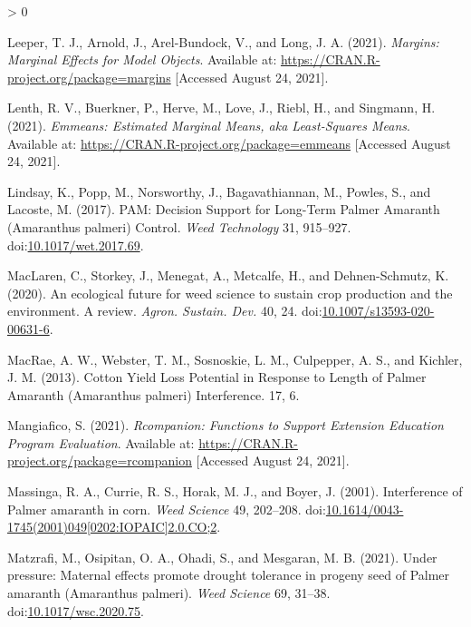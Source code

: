 \documentclass[utf8]{frontiersSCNS}
\newlength{\cslhangindent}
\newenvironment{CSLReferences}[2] %
 {%
  \setlength{\parindent}{0pt}
  \ifodd #1 \everypar{\setlength{\hangindent}{\cslhangindent}}\ignorespaces\fi
  \ifnum #2 > 0
  \setlength{\parskip}{#2\baselineskip}
  \fi
 }%
 {}
\begin{document}
\begin{CSLReferences}{1}{0}
\leavevmode\hypertarget{ref-leeper2021}{}%
Leeper, T. J., Arnold, J., Arel-Bundock, V., and Long, J. A. (2021).
\emph{Margins: {Marginal Effects} for {Model Objects}}. Available at:
\url{https://CRAN.R-project.org/package=margins} {[}Accessed August 24,
2021{]}.

\leavevmode\hypertarget{ref-lenth2021}{}%
Lenth, R. V., Buerkner, P., Herve, M., Love, J., Riebl, H., and
Singmann, H. (2021). \emph{Emmeans: {Estimated Marginal Means}, aka
{Least}-{Squares Means}}. Available at:
\url{https://CRAN.R-project.org/package=emmeans} {[}Accessed August 24,
2021{]}.

\leavevmode\hypertarget{ref-lindsay2017}{}%
Lindsay, K., Popp, M., Norsworthy, J., Bagavathiannan, M., Powles, S.,
and Lacoste, M. (2017). {PAM}: {Decision Support} for {Long}-{Term
Palmer Amaranth} ({Amaranthus} palmeri) {Control}. \emph{Weed
Technology} 31, 915--927.
doi:\href{https://doi.org/10.1017/wet.2017.69}{10.1017/wet.2017.69}.

\leavevmode\hypertarget{ref-maclaren2020}{}%
MacLaren, C., Storkey, J., Menegat, A., Metcalfe, H., and
Dehnen-Schmutz, K. (2020). An ecological future for weed science to
sustain crop production and the environment. {A} review. \emph{Agron.
Sustain. Dev.} 40, 24.
doi:\href{https://doi.org/10.1007/s13593-020-00631-6}{10.1007/s13593-020-00631-6}.

\leavevmode\hypertarget{ref-macrae2013}{}%
MacRae, A. W., Webster, T. M., Sosnoskie, L. M., Culpepper, A. S., and
Kichler, J. M. (2013). Cotton {Yield Loss Potential} in {Response} to
{Length} of {Palmer Amaranth} ({Amaranthus} palmeri) {Interference}. 17,
6.

\leavevmode\hypertarget{ref-mangiafico2021}{}%
Mangiafico, S. (2021). \emph{Rcompanion: {Functions} to {Support
Extension Education Program Evaluation}}. Available at:
\url{https://CRAN.R-project.org/package=rcompanion} {[}Accessed August
24, 2021{]}.

\leavevmode\hypertarget{ref-massinga2001}{}%
Massinga, R. A., Currie, R. S., Horak, M. J., and Boyer, J. (2001).
Interference of {Palmer} amaranth in corn. \emph{Weed Science} 49,
202--208.
doi:\href{https://doi.org/10.1614/0043-1745(2001)049\%5B0202:IOPAIC\%5D2.0.CO;2}{10.1614/0043-1745(2001)049{[}0202:IOPAIC{]}2.0.CO;2}.

\leavevmode\hypertarget{ref-matzrafi2021}{}%
Matzrafi, M., Osipitan, O. A., Ohadi, S., and Mesgaran, M. B. (2021).
Under pressure: Maternal effects promote drought tolerance in progeny
seed of {Palmer} amaranth ({Amaranthus} palmeri). \emph{Weed Science}
69, 31--38.
doi:\href{https://doi.org/10.1017/wsc.2020.75}{10.1017/wsc.2020.75}.


\end{CSLReferences}
\end{document}
